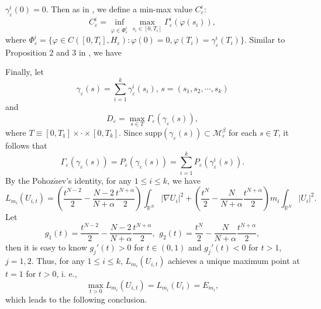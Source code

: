 \documentclass[12pt,reqno]{amsart}
\numberwithin{equation}{section}
\newtheorem{proposition}{Proposition}[section]
\begin{document}
$\gamma_{\varepsilon}^i(0)=0$. Then as in \cite{bj}, we define a min-max value $C_{\varepsilon}^i:$
$$C_{\varepsilon}^i=\inf_{{\varphi}\in \Phi_{\varepsilon}^i}\max_{s_i\in [0,T_i]}{\Gamma}_{\varepsilon}^i({\varphi}(s_i)),$$
where $\Phi_{\varepsilon}^i=\{{\varphi}\in C([0,T_i],H_{\varepsilon}):
{\varphi}(0)=0,{\varphi}(T_i)=\gamma_{\varepsilon}^i(T_i)\}$.
Similar to Proposition 2 and 3 in \cite{byeon}, we have
\noindent Finally, let
$$
\gamma_{\varepsilon}(s)=\sum_{i=1}^k\gamma_{\varepsilon}^i(s_i),\, s=(s_1,s_2,\cdots,s_k)
$$
and $$D_{\varepsilon}=\max_{s\in T}{\Gamma}_{\varepsilon}(\gamma_{\varepsilon}(s)),$$ where $T\equiv[0,T_1]\times\cdot\times[0,T_k]$. Since $\mbox{supp}(\gamma_{\varepsilon}(s))\subset \mathcal{M}^{\beta}_{\varepsilon}$ for each $s\in T$, it follows that
$$
{\Gamma}_{\varepsilon}(\gamma_{\varepsilon}(s))=P_{\varepsilon}(\gamma_{\varepsilon}(s))=\sum_{i=1}^kP_{\varepsilon}(\gamma_{\varepsilon}^i(s)).
$$
By the Pohoz$\check{a}$ev's identity, for any $1\le i\le k$, we have
$$
L_{m_i}(U_{i,t})=\left(\frac{t^{N-2}}{2}-\frac{N-2}{N+{\alpha}}\frac{t^{N+{\alpha}}}{2}\right)\int_{\mathbb R^N}|\nabla U_i|^2+\left(\frac{t^{N}}{2}-\frac{N}{N+{\alpha}}\frac{t^{N+{\alpha}}}{2}\right)m_i\int_{\mathbb R^N}|U_i|^2.
$$
Let $$g_1(t)=\frac{t^{N-2}}{2}-\frac{N-2}{N+{\alpha}}\frac{t^{N+{\alpha}}}{2},\,\ g_2(t)=\frac{t^{N}}{2}-\frac{N}{N+{\alpha}}\frac{t^{N+{\alpha}}}{2},$$
then it is easy to know $g_j'(t)>0$ for $t\in(0,1)$ and $g_j'(t)<0$ for $t>1$, $j=1,2$. Thus, for any $1\le i\le k$, $L_{m_i}(U_{i,t})$ achieves a unique maximum point at $t=1$ for $t>0$, i. e.,
$$
\max_{t>0}L_{m_i}(U_{i,t})=L_{m_i}(U_{i})=E_{m_i},
$$
which leads to the following conclusion.
\end{document}
